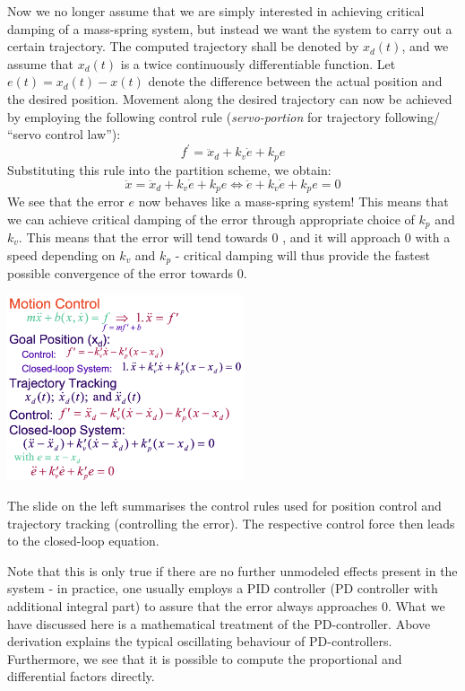Now we no longer assume that we are simply interested in achieving critical damping of a mass-spring system, but instead we want the system to carry out a certain trajectory. The computed trajectory shall be denoted by $x_{d}(t)$, and we assume that $x_{d}(t)$ is a twice continuously differentiable function. Let $e(t)=x_{d}(t)-x(t)$ denote the difference between the actual position and the desired position.
Movement along the desired trajectory can now be achieved by employing the following control rule (\textit{servo-portion} for trajectory following/ ``servo control law''):
$$
f^{\prime}=\ddot{x}_{d}+k_{v} \dot{e}+k_{p} e
$$
Substituting this rule into the partition scheme, we obtain:
$$
\ddot{x}=\ddot{x}_{d}+k_{v} \dot{e}+k_{p} e \Leftrightarrow \ddot{e}+k_{v} \dot{e}+k_{p} e=0
$$
We see that the error $e$ now behaves like a mass-spring system! This means that we can achieve critical damping of the error through appropriate choice of $k_{p}$ and $k_{v}$. This means that the error will tend towards 0 , and it will approach 0 with a speed depending on $k_{v}$ and $k_{p}$ - critical damping will thus provide the fastest possible convergence of the error towards 0. 
\\

\begin{minipage}[c]{0.45\textwidth}
	\includegraphics[width=7cm]{sections/imgs/7_motion_control.png}
\end{minipage}
\hfill
\begin{minipage}[c]{0.45\textwidth}
The slide on the left summarises the control rules used for position control and trajectory tracking (controlling the error). The respective control force then leads to the closed-loop equation.
\end{minipage}


Note that this is only true if there are no further unmodeled effects present in the system - in practice, one usually employs a PID controller (PD controller with additional integral part) to assure that the error always approaches $0 .$
What we have discussed here is a mathematical treatment of the PD-controller. Above derivation explains the typical oscillating behaviour of PD-controllers. Furthermore, we see that it is possible to compute the proportional and differential factors directly.


